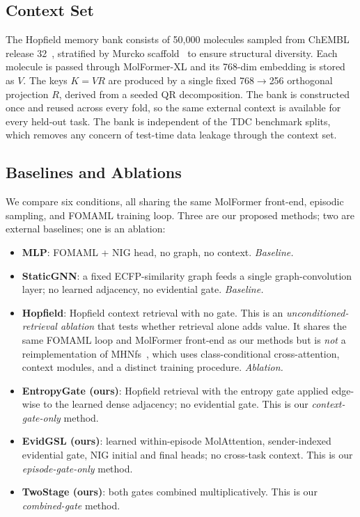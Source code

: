 \documentclass{article}
\theoremstyle{plain}
\theoremstyle{definition}
\theoremstyle{remark}
\begin{document}
\subsection{Context Set}

The Hopfield memory bank consists of 50,000 molecules sampled from ChEMBL release 32~\citep{mendez2019chembl}, stratified by Murcko scaffold~\citep{lipkus1999murcko} to ensure structural diversity. Each molecule is passed through MolFormer-XL and its 768-dim embedding is stored as $V$. The keys $K=VR$ are produced by a single fixed 768$\to$256 orthogonal projection $R$, derived from a seeded QR decomposition. The bank is constructed once and reused across every fold, so the same external context is available for every held-out task. The bank is independent of the TDC benchmark splits, which removes any concern of test-time data leakage through the context set.

\subsection{Baselines and Ablations}

We compare six conditions, all sharing the same MolFormer front-end, episodic sampling, and FOMAML training loop. Three are our proposed methods; two are external baselines; one is an ablation:

\begin{itemize}
    \item \textbf{MLP}: FOMAML + NIG head, no graph, no context. \emph{Baseline.}
    \item \textbf{StaticGNN}: a fixed ECFP-similarity graph feeds a single graph-convolution layer; no learned adjacency, no evidential gate. \emph{Baseline.}
    \item \textbf{Hopfield}: Hopfield context retrieval with no gate. This is an \emph{unconditioned-retrieval ablation} that tests whether retrieval alone adds value. It shares the same FOMAML loop and MolFormer front-end as our methods but is \emph{not} a reimplementation of MHNfs~\citep{schimunek2024mhnfs}, which uses class-conditional cross-attention, context modules, and a distinct training procedure. \emph{Ablation.}
    \item \textbf{EntropyGate (ours)}: Hopfield retrieval with the entropy gate applied edge-wise to the learned dense adjacency; no evidential gate. This is our \emph{context-gate-only} method.
    \item \textbf{EvidGSL (ours)}: learned within-episode MolAttention, sender-indexed evidential gate, NIG initial and final heads; no cross-task context. This is our \emph{episode-gate-only} method.
    \item \textbf{TwoStage (ours)}: both gates combined multiplicatively. This is our \emph{combined-gate} method.
\end{itemize}
\end{document}
